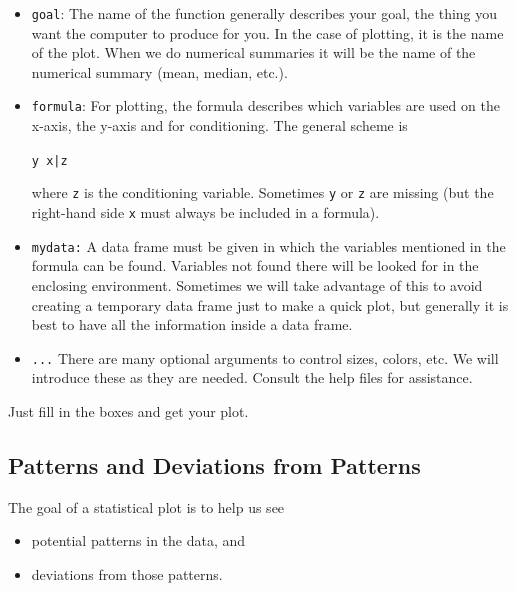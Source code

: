 \documentclass[twoside]{book}\usepackage[]{graphicx}\usepackage[]{xcolor}
\makeatletter
\newcommand{\hlopt}[1]{\textcolor[rgb]{0,0,0}{#1}}%
\newcommand{\hlstd}[1]{\textcolor[rgb]{0.345,0.345,0.345}{#1}}%
\newenvironment{kframe}{%
 \def\at@end@of@kframe{}%
 \ifinner\ifhmode%
  \def\at@end@of@kframe{\end{minipage}}%
  \begin{minipage}{\columnwidth}%
 \fi\fi%
 \def\FrameCommand##1{\hskip\@totalleftmargin \hskip-\fboxsep
 \colorbox{shadecolor}{##1}\hskip-\fboxsep
     \hskip-\linewidth \hskip-\@totalleftmargin \hskip\columnwidth}%
 \MakeFramed {\advance\hsize-\width
   \@totalleftmargin\z@ \linewidth\hsize
   \@setminipage}}%
 {\par\unskip\endMakeFramed%
 \at@end@of@kframe}
\newenvironment{knitrout}{}{} %
\makeatother
\begin{document}
\begin{itemize}
	\item \texttt{goal}: The name of the function generally describes your goal, 
		the thing you want the computer to produce for you.  In the case of plotting,
		it is the name of the plot.  When we do numerical summaries it will be the 
		name of the numerical summary (mean, median, etc.).
	\item
		\texttt{formula}: For plotting, the formula describes which variables are 
		used on the x-axis, the y-axis and for conditioning.  The general scheme is
\begin{knitrout}
\color{fgcolor}\begin{kframe}
\begin{alltt}
\hlstd{y} \hlopt{~} \hlstd{x} \hlopt{|} \hlstd{z}
\end{alltt}
\end{kframe}
\end{knitrout}
		where \texttt{z} is the conditioning variable.  Sometimes \texttt{y} or \texttt{z} 
		are missing (but the right-hand side \texttt{x} must always be included in a formula).
	\item
		\texttt{mydata:} A data frame must be given in which the variables mentioned in
		the formula can be found.  Variables not found there will be looked for in the 
		enclosing environment.  Sometimes we will take advantage of this to avoid creating
		a temporary data frame just to make a quick plot, but generally it is best to have
		all the information inside a data frame.
	\item
	\texttt{...} There are many optional arguments to control sizes, colors, etc.
	We will introduce these as they are needed. Consult the help files for assistance.
		
\end{itemize}

Just fill in the boxes and get your plot.

\subsection{Patterns and Deviations from Patterns}
The goal of a statistical plot is to help us see 
\begin{itemize}
\item 
potential patterns in the data, and 
\item
deviations from those patterns.  
\end{itemize}
\end{document}
